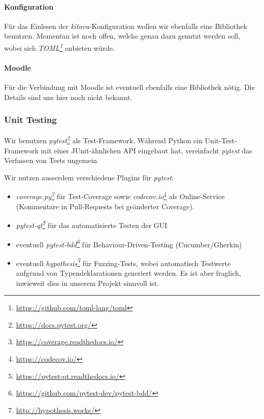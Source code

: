 \documentclass[a4paper]{article}
\newcommand{\tool}[2]{\emph{#1\footnote{\url{#2}}}}
\begin{document}
\paragraph{Konfiguration}

Für das Einlesen der \emph{kitovu}-Konfiguration wollen wir ebenfalls eine Bibliothek
benutzen. Momentan ist noch offen, welche genau dazu genutzt werden
soll, wobei sich \tool{TOML}{https://github.com/toml-lang/toml} anbieten würde.

\paragraph{Moodle}

Für die Verbindung mit Moodle ist eventuell ebenfalls eine Bibliothek nötig.
Die Details sind uns hier noch nicht bekannt.

\subsubsection{Unit Testing}

Wir benutzen \tool{pytest}{https://docs.pytest.org/} als Test-Framework. Während Python ein Unit-Test-Framework mit einer JUnit-ähnlichen API
eingebaut hat, vereinfacht \emph{pytest} das Verfassen von Tests ungemein.

Wir nutzen ausserdem verschiedene Plugins für \emph{pytest}:

\begin{itemize}
\item \tool{coverage.py}{https://coverage.readthedocs.io/} für
    Test-Coverage sowie \tool{codecov.io}{https://codecov.io/}
    als Online-Service (Kommentare in Pull-Requests bei geänderter Coverage).
\item \tool{pytest-qt}{https://pytest-qt.readthedocs.io/} für das
    automatisierte Testen der GUI
\item eventuell \tool{pytest-bdd}{https://github.com/pytest-dev/pytest-bdd/} für Behaviour-Driven-Testing (Cucumber/Gherkin)
\item eventuell \tool{hypothesis}{http://hypothesis.works/} für
  Fuzzing-Tests, wobei automatisch Testwerte aufgrund von Typendeklarationen
  generiert werden. Es ist aber fraglich, inwieweit dies in unserem Projekt sinnvoll ist.
\end{itemize}
\end{document}
